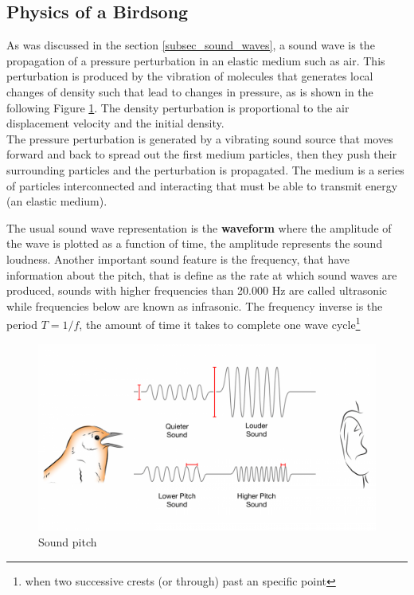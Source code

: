 \subsection{Physics of a Birdsong}

As was discussed in the section \ref{subsec_sound_waves}, a sound wave is the propagation of a pressure perturbation in an elastic medium such as air. This perturbation is produced by the vibration of molecules that generates local changes of density such that lead to changes in pressure, as is shown in the following Figure \ref{fig:air_motion}. The density perturbation is proportional to the air displacement velocity and the initial density.\\

The pressure perturbation is generated by a vibrating sound source that moves forward and back to spread out the first medium particles, then they push their surrounding particles and the perturbation is propagated. The medium is a series of particles interconnected and interacting that must be able to transmit energy (an elastic medium).

\begin{figure}[H]
    \centering
    \caption{\cite{birdsongs_cornell}}
    \label{fig:air_motion}
\end{figure}



The usual sound wave representation is the \textbf{waveform} where the amplitude of the wave is plotted as a function of time, the amplitude represents the sound loudness. Another important sound feature is the frequency, that have information about the pitch, that is define as the rate at which sound waves are produced, sounds with higher frequencies than 20.000 Hz are called ultrasonic while frequencies below are known as infrasonic. The frequency inverse is the period $T=1/f$, the amount of time it takes to complete one wave cycle\footnote{when two successive crests (or through) past an specific point} 

\begin{figure}[H]
    \centering
    \includegraphics[scale=0.35]{Images/sound_pitch.png}
    \caption{Sound pitch \cite{birdsongs_cornell} }
    \label{fig:sound_pitch}
\end{figure}

